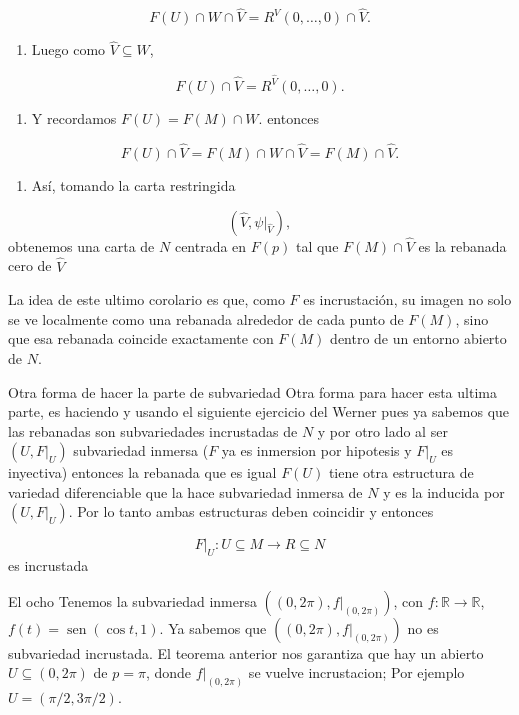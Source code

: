 \begin{bookproof}{}
\[
F(U)\cap W\cap \widehat V=R^V(0,\ldots,0)\cap \widehat V.
\]
\begin{enumerate}[start=11]
\item Luego como $\widehat V\subseteq W$,
\end{enumerate}
\[
F(U)\cap \widehat V=R^{\widehat V}(0,\ldots,0).
\]
\begin{enumerate}[start=12]
\item Y recordamos $F(U)=F(M)\cap W.$ entonces
\end{enumerate}
\[
F(U)\cap \widehat{V}=F(M)\cap W\cap \widehat{V}=F(M)\cap \widehat{V}.
\]
\begin{enumerate}[start=13]
\item Así, tomando la carta restringida
\end{enumerate}
\[
(\widehat V,\psi|_{\widehat V}),
\]
obtenemos una carta de $N$ centrada en $F(p)$ tal que $F(M)\cap \widehat V$ es la rebanada cero de $\widehat V$

\bookqed
\end{bookproof}
\label{blk:8f3892}
\begin{bookremark}{}
La idea de este ultimo corolario es que, como $F$ es incrustación, su imagen no solo se ve localmente como una rebanada alrededor de cada punto de $F(M)$, sino que esa rebanada coincide exactamente con $F(M)$ dentro de un entorno abierto de $N$.

\end{bookremark}
\begin{bookremark}{Otra forma de hacer la parte de subvariedad}
Otra forma para hacer esta ultima parte, es haciendo y usando el siguiente ejercicio del Werner 
 pues ya sabemos que las rebanadas son subvariedades incrustadas de $N$ y por otro lado al ser $(U,F|_{U})$ subvariedad inmersa ($F$ ya es inmersion por hipotesis y $F|_{U}$ es inyectiva) entonces la rebanada que es igual $F(U)$ tiene otra estructura de variedad diferenciable que la hace subvariedad inmersa de $N$ y es la inducida por $(U,F|_{U})$. Por lo tanto ambas estructuras deben coincidir y entonces

\[
F|_{U}:U\subseteq M\rightarrow R\subseteq N
\]
es incrustada

\end{bookremark}
\begin{bookexample}{El ocho}
Tenemos la subvariedad inmersa $((0,2\pi),f|_{(0,2\pi)})$, con $f:\mathbb R\to\mathbb R$, $f(t)=\operatorname{sen}(\cos t,1)$. Ya sabemos que $((0,2\pi),f|_{(0,2\pi)})$ no es subvariedad incrustada. El teorema anterior nos garantiza que hay un abierto $U\subseteq (0,2\pi)$ de $p=\pi$, donde $f|_{(0,2\pi)}$ se vuelve incrustacion; Por ejemplo $U=(\pi/2,3\pi/2)$. 


\end{bookexample}
